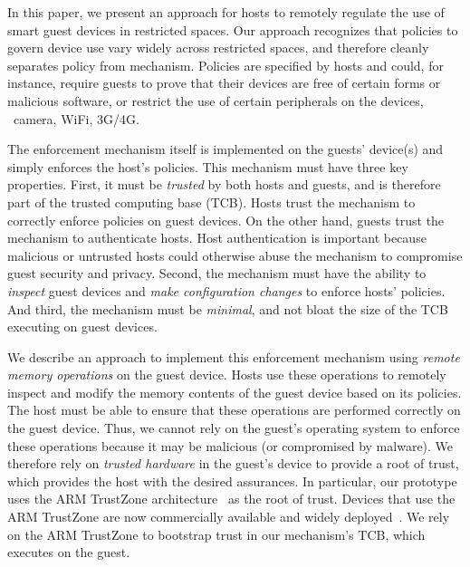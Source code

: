 In this paper, we present an approach for hosts to remotely regulate the use of
smart guest devices in restricted spaces. Our approach recognizes that policies
to govern device use vary widely across restricted spaces, and therefore
cleanly separates policy from mechanism. Policies are specified by hosts and
could, for instance, require guests to prove that their devices are free of
certain forms or malicious software, or restrict the use of certain peripherals
on the devices, \eg\ camera, WiFi, 3G/4G. 

The enforcement mechanism itself is implemented on the guests' device(s) and
simply enforces the host's policies. This mechanism must have three key
properties.  First, it must be \textit{trusted} by both hosts and guests, and
is therefore part of the trusted computing base (TCB). Hosts trust the
mechanism to correctly enforce policies on guest devices. On the other hand,
guests trust the mechanism to authenticate hosts. Host authentication is
important because malicious or untrusted hosts could otherwise abuse the
mechanism to compromise guest security and privacy.  Second, the mechanism must
have the ability to \textit{inspect} guest devices and \textit{make
configuration changes} to enforce hosts' policies.  And third, the mechanism
must be \textit{minimal}, and not bloat the size of the TCB executing on guest
devices.

We describe an approach to implement this enforcement mechanism using
\textit{remote memory operations} on the guest device. Hosts use these
operations to remotely inspect and modify the memory contents of the guest
device based on its policies. The host must be able to ensure that these
operations are performed correctly on the guest device. Thus, we cannot rely on
the guest's operating system to enforce these operations because it may be
malicious (or compromised by malware). We therefore rely on \textit{trusted
hardware} in the guest's device to provide a root of trust, which provides the
host with the desired assurances.  In particular, our prototype uses the ARM
TrustZone architecture~\cite{armtz} as the root of trust. Devices that use the
ARM TrustZone are now commercially available and widely
deployed~\cite{knox:ccs14}. We rely on the ARM TrustZone to bootstrap trust in
our mechanism's TCB, which executes on the guest. 

